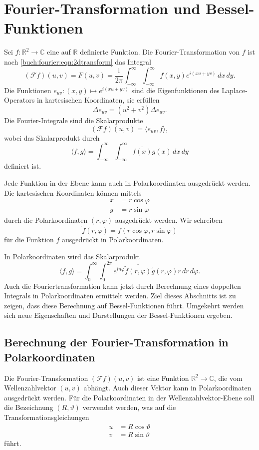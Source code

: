 %
%
%
\section{Fourier-Transformation und Bessel-Funktionen
\label{buch:fourier:section:fourier-und-bessel}}

Sei $f\colon \mathbb{R}^2\to\mathbb{C}$ eine auf $\mathbb{R}$ definierte
Funktion.
Die Fourier-Transformation von $f$ ist nach
\eqref{buch:fourier:eqn:2dtransform} das Integral
\begin{equation}
(\mathscr{F}f)(u,v)
=
F(u,v)
=
\frac{1}{2\pi}
\int_{-\infty}^\infty
\int_{-\infty}^\infty
f(x,y) e^{i(xu+yv)}
\,dx\,dy.
\label{buch:fourier:eqn:2dfourier}
\end{equation}
Die Funktionen $e_{uv}\colon (x,y)\mapsto e^{i(xu+yv)}$
sind die Eigenfunktionen des Laplace-Operators in kartesischen Koordinaten,
%
sie erfüllen
\[
\Delta e_{uv} = (u^2+v^2) \Delta e_{uv}.
\]
Die Fourier-Integrale sind die Skalarprodukte
\[
(\mathscr{F}f)(u,v)
=
\langle
e_{uv},
f
\rangle,
\]
wobei das Skalarprodukt durch
\[
\langle f,g\rangle
=
\int_{-\infty}^\infty
\int_{-\infty}^\infty
\overline{f(x)} g(x)
\,dx\,dy
\]
definiert ist.

Jede Funktion in der Ebene kann auch in Polarkoordinaten ausgedrückt werden.
Die kartesischen Koordinaten können mittels
\begin{align*}
x&=r\cos\varphi \\
y&=r\sin\varphi
\end{align*}
durch die Polarkoordinaten $(r,\varphi)$ ausgedrückt werden.
%
Wir schreiben
\[
\tilde{f}(r,\varphi)
=
f(r\cos\varphi,r\sin\varphi)
\]
für die Funktion $f$ ausgedrückt in Polarkoordinaten.

In Polarkoordinaten wird das Skalarprodukt
\[
\langle f,g\rangle
=
\int_0^\infty \int_{0}^{2\pi} e^{in\varphi}
\overline{
\tilde{f}(r,\varphi)
}
\tilde{g}(r,\varphi)
r\,dr\,d\varphi.
\]
Auch die Fouriertransformation kann jetzt durch Berechnung eines
doppelten Integrals in Polarkoordinaten ermittelt werden.
Ziel dieses Abschnitts ist zu zeigen, dass diese Berechnung auf
Bessel-Funktionen führt.
Umgekehrt werden sich neue Eigenschaften und Darstellungen der
Bessel-Funktionen ergeben.

%
%
\subsection{Berechnung der Fourier-Transformation in Polarkoordinaten}
Die Fourier-Transformation $(\mathscr{F}f)(u,v)$ ist eine Funktion
$\mathbb{R}^2\to\mathbb{C}$, die vom Wellenzahlvektor $(u,v)$ abhängt.
%
Auch dieser Vektor kann in Polarkoordinaten ausgedrückt werden.
Für die Polarkoordinaten in der Wellenzahlvektor-Ebene soll die Bezeichnung
$(R,\vartheta)$ verwendet werden, was auf die Transformationsgleichungen
\begin{align*}
u&=R\cos\vartheta\\
v&=R\sin\vartheta
\end{align*}
führt.

